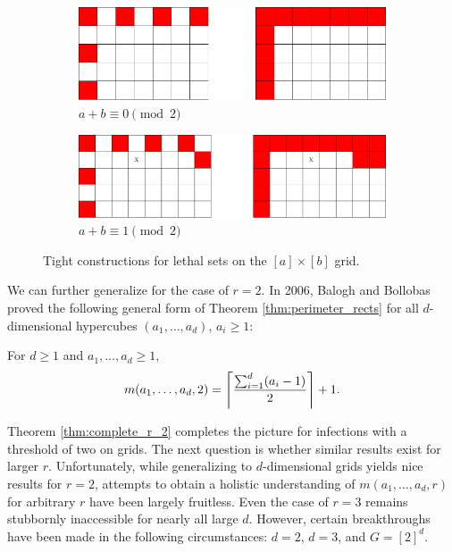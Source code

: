 \begin{figure}[]
\centering
\begin{subfigure}{0.4\textwidth}
	\includegraphics[width=\textwidth]{figures/1/5x7x1.pdf}
	\caption{$a+b \equiv 0 \pmod 2$}
	\label{fig:sa_construction_2d_a}
\end{subfigure} \hfill%
\begin{subfigure}{0.45\textwidth}
	\includegraphics[width=\textwidth]{figures/1/5x8x1.pdf}
	\caption{$a+b \equiv 1 \pmod 2$}
	\label{fig:sa_construction_2d_b}
\end{subfigure}
\caption{Tight constructions for lethal sets on the $[a] \times [b]$ grid.}
\label{fig:sa_construction_2d}
\end{figure} 

We can further generalize for the case of $r=2$. In 2006, Balogh and Bollobas \cite{balogh:2006} proved the following general form of Theorem \ref{thm:perimeter_rects} for all $d$-dimensional hypercubes $(a_1, \dots, a_d)$, $a_i \geq 1$:

\begin{thm}[Balogh]
\label{thm:complete_r_2}
For $d \geq 1$ and $a_1, \dots, a_d \geq 1$, 
$$m(a_1, \dots, a_d, 2) = \ceil*{\frac{\sum_{i=1}^d (a_i-1)}{2}}+1.$$
\end{thm}

Theorem \ref{thm:complete_r_2} completes the picture for infections with a threshold of two on grids. The next question is whether similar results exist for larger $r$. Unfortunately, while generalizing to $d$-dimensional grids yields nice results for $r=2$, attempts to obtain a holistic understanding of $m(a_1, \dots, a_d, r)$ for arbitrary $r$ have been largely fruitless. Even the case of $r=3$ remains stubbornly inaccessible for nearly all large $d$. However, certain breakthroughs have been made in the following circumstances: $d=2$, $d=3$, and $G=[2]^d$.

